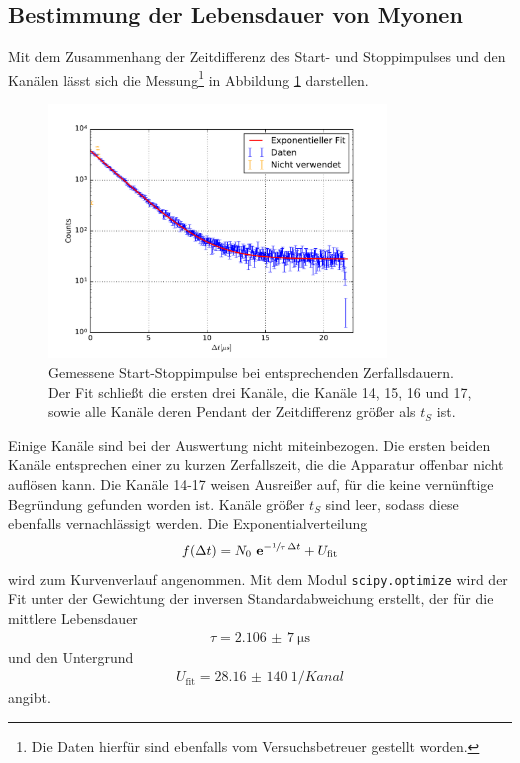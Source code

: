 \subsection{Bestimmung der Lebensdauer von Myonen}
Mit dem Zusammenhang der Zeitdifferenz des Start- und Stoppimpulses und den Kanälen lässt sich die Messung\footnote[2]{Die Daten hierfür sind ebenfalls
vom Versuchsbetreuer gestellt worden.} in Abbildung \ref{pic:lebensdauer} darstellen.
\begin{figure}[t]
 \includegraphics[width=0.8\textwidth]{../pics/lebensdauer_fit}
 \caption{Gemessene Start-Stoppimpulse bei entsprechenden Zerfallsdauern. Der Fit schließt die ersten drei Kanäle, die Kanäle 14, 15, 16 und 17, sowie
 alle Kanäle deren Pendant der Zeitdifferenz größer als $t_S$ ist.}
 \label{pic:lebensdauer}
\end{figure}
Einige Kanäle sind bei der Auswertung nicht miteinbezogen. Die ersten beiden Kanäle entsprechen einer zu kurzen Zerfallszeit,
die die Apparatur offenbar nicht auflösen kann. Die Kanäle 14-17 weisen Ausreißer auf, für die keine vernünftige Begründung gefunden worden ist.
Kanäle größer $t_S$ sind leer, sodass diese ebenfalls vernachlässigt werden.
Die Exponentialverteilung
\begin{align}
 f(\Delta t) = N_0 \ \mathbf{e}^{-{\sfrac{1}{\tau}}\,\Delta t} + U_\text{fit}
\end{align}
wird zum Kurvenverlauf angenommen. Mit dem Modul \texttt{scipy.optimize} wird der Fit unter der Gewichtung der inversen Standardabweichung erstellt,
der für die mittlere Lebensdauer
\begin{align}
 \tau = \SI{2,106(7)}{\micro\second}
 \label{eq:tau}
\end{align}
und den Untergrund
\begin{align}
 U_\text{fit} = \SI{28,16(140)}{1\per Kanal}
 \label{eq:backgrExp}
\end{align}
angibt.
